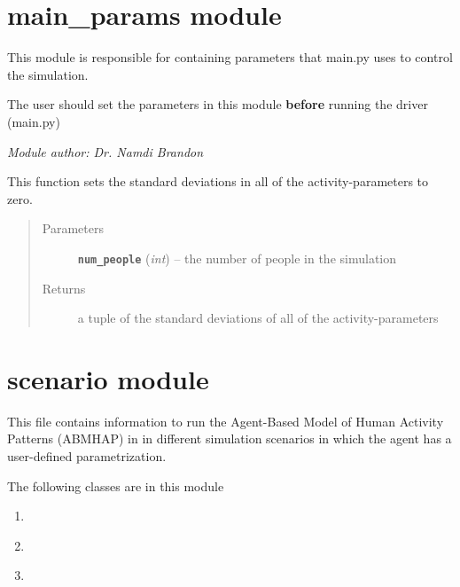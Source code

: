 \documentclass[letterpaper,10pt,english]{sphinxmanual}
\begin{document}
\section{main\_params module}
\label{main_params::doc}\label{main_params:module-main_params}\label{main_params:main-params-module}
This module is responsible for containing parameters that main.py uses to control the simulation.

The user should set the parameters in this module \textbf{before} running the driver (main.py)

\emph{Module author: Dr. Namdi Brandon}

\begin{fulllineitems}
\label{main_params:main_params.set_no_variation}
This function sets the standard deviations in all of the activity-parameters to zero.
\begin{quote}\begin{description}
\item[{Parameters}] \leavevmode
\textbf{\texttt{num\_people}} (\emph{int}) -- the number of people in the simulation

\item[{Returns}] \leavevmode
a tuple of the standard deviations of all of the activity-parameters

\end{description}\end{quote}

\end{fulllineitems}



\section{scenario module}
\label{scenario::doc}\label{scenario:module-scenario}\label{scenario:scenario-module}
This file contains information to run the Agent-Based Model of Human Activity Patterns (ABMHAP) in in different simulation scenarios in which the agent has a user-defined parametrization.

The following classes are in this module
\begin{enumerate}
\item {} 
{\hyperref[scenario:scenario.Scenario]{\emph{}}}

\item {} 
{\hyperref[scenario:scenario.Solo]{\emph{}}}

\item {} 
{\hyperref[scenario:scenario.Duo]{\emph{}}}

\end{enumerate}
\end{document}
